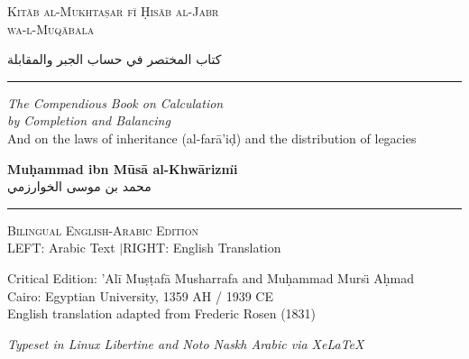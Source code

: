 \documentclass[10pt,a4paper]{book}
\newcommand{\ar}[1]{{\arabicfont\beginR #1\endR}}
\begin{document}
\begin{titlepage}
\begin{center}

\vspace*{1cm}

{\fontsize{28}{34}\selectfont\textcolor{titlecolor}{\textsc{Kit\=ab al-Mukhta\d{s}ar f\"{\i} \d{H}is\=ab al-Jabr}}}\\[0.2cm]
{\fontsize{28}{34}\selectfont\textcolor{titlecolor}{\textsc{wa-l-Muq\=abala}}}

\vspace{0.6cm}

\begin{arabicbox}[width=0.85\textwidth,boxrule=0pt,colback=arabicbg]
\begin{center}
\Large
كتاب المختصر في حساب الجبر والمقابلة
\end{center}
\end{arabicbox}

\vspace{0.6cm}

\rule{0.5\textwidth}{1pt}

\vspace{0.6cm}

{\Large\textit{The Compendious Book on Calculation}}\\[0.15cm]
{\Large\textit{by Completion and Balancing}}\\[0.4cm]
{\normalsize And on the laws of inheritance (al-far\=a'i\d{d}) and the distribution of legacies}

\vspace{0.8cm}

{\LARGE\textbf{Mu\d{h}ammad ibn M\=us\=a al-Khw\=arizm\"{\i}}}\\[0.2cm]
{\Large\ar{محمد بن موسى الخوارزمي}}

\vspace{0.5cm}

\rule{0.3\textwidth}{0.5pt}

\vspace{0.6cm}

{\large\textsc{Bilingual English-Arabic Edition}}\\[0.3cm]
{\small LEFT: Arabic Text \quad\textcolor{columnsepclr}{$|$}\quad RIGHT: English Translation}

\vspace{0.8cm}

{\small Critical Edition: 'Al\=i Mu\d{s}\d{t}af\=a Musharrafa and Mu\d{h}ammad Murs\"{\i} A\d{h}mad}\\[0.15cm]
{\small Cairo: Egyptian University, 1359 AH / 1939 CE}\\[0.3cm]
{\footnotesize English translation adapted from Frederic Rosen (1831)}

\vfill

{\footnotesize\textit{Typeset in Linux Libertine and Noto Naskh Arabic via XeLaTeX}}

\end{center}
\end{titlepage}
\end{document}

